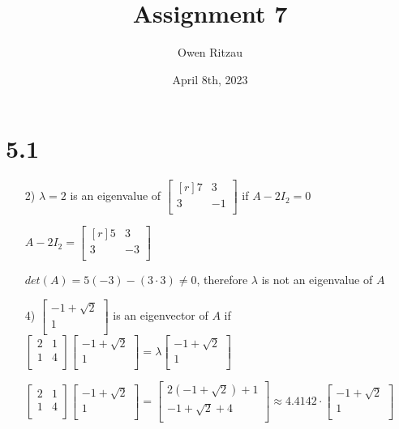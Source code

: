 \documentclass{article}
\title{Assignment 7}
\author{Owen Ritzau}
\date{April 8th, 2023}
\begin{document}
\maketitle
\section* {5.1}
\begin{enumerate}
  \item[2)]
    $\lambda = 2$ is an eigenvalue of $\begin{bmatrix*}[r]
      7 & 3 \\
      3 & -1 \\
    \end{bmatrix*}$ if $A-2 I_2=0$ 
    
    $A-2 I_2=\begin{bmatrix*}[r]
      5 & 3\\
      3 & -3 \\
    \end{bmatrix*}$

    $det(A) = 5(-3) - (3\cdot3) \neq 0$, therefore 
    $\lambda$ is not an eigenvalue of $A$

  \item[4)]
    $\begin{bmatrix*}
      -1 + \sqrt{2} \\
      1 \\
    \end{bmatrix*}$ is an eigenvector of $A$ if 
    $\begin{bmatrix*}
      2 & 1 \\
      1 & 4 \\
    \end{bmatrix*}\begin{bmatrix*}
      -1 + \sqrt{2} \\
      1 \\
    \end{bmatrix*} = \lambda \begin{bmatrix*}
      -1 + \sqrt{2} \\
      1 \\
    \end{bmatrix*}$

    $\begin{bmatrix*}
      2 & 1 \\
      1 & 4 \\
    \end{bmatrix*}\begin{bmatrix*}
      -1 + \sqrt{2} \\
      1 \\
    \end{bmatrix*} = 
    \begin{bmatrix}
      2(-1 + \sqrt{2}) + 1 \\
      -1 + \sqrt{2} + 4 \\
    \end{bmatrix} \approx 4.4142 \cdot \begin{bmatrix*}
      -1 + \sqrt{2} \\
      1 \\
    \end{bmatrix*}$ 


\end{enumerate}
\end{document}
